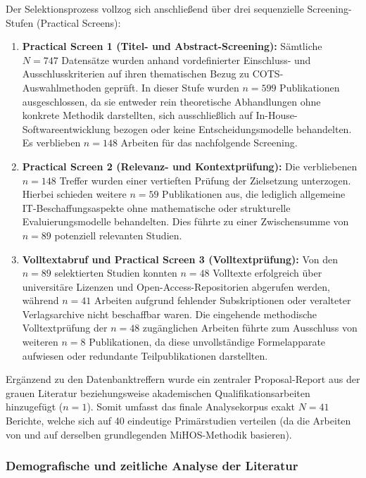 Der Selektionsprozess vollzog sich anschließend über drei sequenzielle Screening-Stufen (Practical Screens):
\begin{enumerate}
    \item \textbf{Practical Screen 1 (Titel- und Abstract-Screening):} Sämtliche $N = 747$ Datensätze wurden anhand vordefinierter Einschluss- und Ausschlusskriterien auf ihren thematischen Bezug zu COTS-Auswahlmethoden geprüft. In dieser Stufe wurden $n = 599$ Publikationen ausgeschlossen, da sie entweder rein theoretische Abhandlungen ohne konkrete Methodik darstellten, sich ausschließlich auf In-House-Softwareentwicklung bezogen oder keine Entscheidungsmodelle behandelten. Es verblieben $n = 148$ Arbeiten für das nachfolgende Screening.
    \item \textbf{Practical Screen 2 (Relevanz- und Kontextprüfung):} Die verbliebenen $n = 148$ Treffer wurden einer vertieften Prüfung der Zielsetzung unterzogen. Hierbei schieden weitere $n = 59$ Publikationen aus, die lediglich allgemeine IT-Beschaffungsaspekte ohne mathematische oder strukturelle Evaluierungsmodelle behandelten. Dies führte zu einer Zwischensumme von $n = 89$ potenziell relevanten Studien.
    \item \textbf{Volltextabruf und Practical Screen 3 (Volltextprüfung):} Von den $n = 89$ selektierten Studien konnten $n = 48$ Volltexte erfolgreich über universitäre Lizenzen und Open-Access-Repositorien abgerufen werden, während $n = 41$ Arbeiten aufgrund fehlender Subskriptionen oder veralteter Verlagsarchive nicht beschaffbar waren. Die eingehende methodische Volltextprüfung der $n = 48$ zugänglichen Arbeiten führte zum Ausschluss von weiteren $n = 8$ Publikationen, da diese unvollständige Formelapparate aufwiesen oder redundante Teilpublikationen darstellten.
\end{enumerate}

Ergänzend zu den Datenbanktreffern wurde ein zentraler Proposal-Report aus der grauen Literatur beziehungsweise akademischen Qualifikationsarbeiten hinzugefügt ($n = 1$). Somit umfasst das finale Analysekorpus exakt $N = 41$ Berichte, welche sich auf 40 eindeutige Primärstudien verteilen (da die Arbeiten von \cite{MC9UMXZZ} und \cite{9F79VAAB} auf derselben grundlegenden MiHOS-Methodik basieren).

\subsubsection{Demografische und zeitliche Analyse der Literatur}

